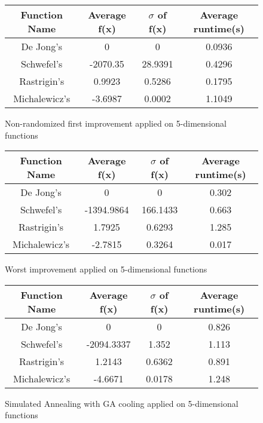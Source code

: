 \documentclass{article}
\begin{document}
\begin{figure}[H]
    \begin{tabular}{|c||c|c|c|} \hline
        Function Name & Average f(x) & $\sigma$ of f(x) & Average runtime(s) \\ \hline \hline
        De Jong's & 0 & 0 & 0.0936 \\ \hline
        Schwefel's & -2070.35 & 28.9391 & 0.4296 \\ \hline
        Rastrigin's & 0.9923 & 0.5286 & 0.1795 \\ \hline
        Michalewicz's & -3.6987 & 0.0002 & 1.1049 \\ \hline
    \end{tabular}
    \caption{Non-randomized first improvement applied on 5-dimensional functions}
    \end{figure}

\begin{figure}[H]
\begin{tabular}{|c||c|c|c|} \hline
	Function Name & Average f(x) & $\sigma$ of f(x) & Average runtime(s) \\ \hline \hline
	De Jong's & 0 & 0 & 0.302 \\ \hline
	Schwefel's & -1394.9864 & 166.1433 & 0.663 \\ \hline
	Rastrigin's & 1.7925 & 0.6293 & 1.285 \\ \hline
	Michalewicz's & -2.7815 & 0.3264 & 0.017 \\ \hline
\end{tabular}
\caption{Worst improvement applied on 5-dimensional functions}
\end{figure}

\begin{figure}[H]
\begin{tabular}{|c||c|c|c|} \hline
	Function Name & Average f(x) & $\sigma$ of f(x) & Average runtime(s) \\ \hline \hline
	De Jong's & 0 & 0 & 0.826 \\ \hline
	Schwefel's & -2094.3337 & 1.352 & 1.113 \\ \hline
	Rastrigin's & 1.2143 & 0.6362 & 0.891 \\ \hline
	Michalewicz's & -4.6671 & 0.0178 & 1.248 \\ \hline
\end{tabular}
\caption{Simulated Annealing with GA cooling applied on 5-dimensional functions}
\end{figure}
\end{document}

